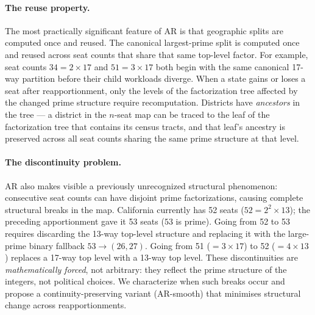 \paragraph{The reuse property.}
The most practically significant feature of AR is that geographic splits are
computed once and reused. The canonical largest-prime split is computed once
and reused across seat counts that share that same top-level factor. For
example, seat counts $34 = 2 \times 17$ and $51 = 3 \times 17$ both begin with
the same canonical 17-way partition before their child workloads diverge.
When a state gains or loses a seat after reapportionment, only the levels of
the factorization tree affected by the changed prime structure require
recomputation. Districts have \emph{ancestors} in the tree --- a district
in the $n$-seat map can be traced to the leaf of the factorization tree that
contains its census tracts, and that leaf's ancestry is preserved across all
seat counts sharing the same prime structure at that level.

\paragraph{The discontinuity problem.}
AR also makes visible a previously unrecognized structural phenomenon:
consecutive seat counts can have disjoint prime factorizations, causing
complete structural breaks in the map. California currently has 52 seats
($52 = 2^2 \times 13$); the preceding apportionment gave it 53 seats
($53$ is prime). Going from 52 to 53 requires discarding the 13-way top-level
structure and replacing it with the large-prime binary fallback
$53 \to (26,27)$. Going from 51 ($= 3 \times 17$) to 52 ($= 4 \times 13$)
replaces a 17-way top level with a 13-way top level. These discontinuities are
\emph{mathematically forced}, not arbitrary: they reflect the prime
structure of the integers, not political choices. We characterize when such
breaks occur and propose a continuity-preserving variant (AR-smooth) that
minimises structural change across reapportionments.

